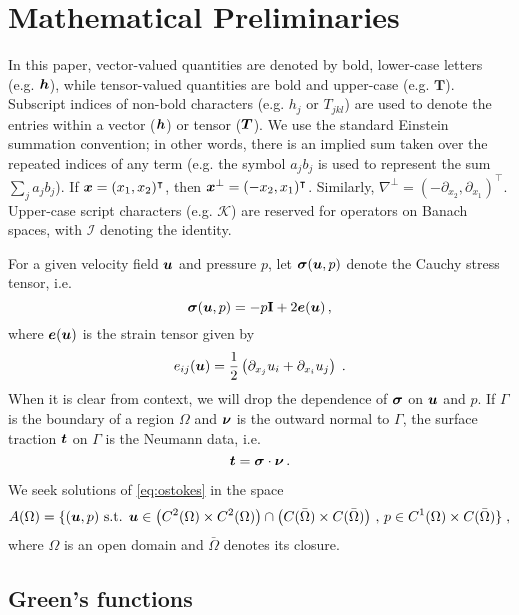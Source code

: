 \section{Mathematical Preliminaries}

In this paper, vector-valued
quantities are denoted by bold, lower-case letters
(e.g. ${\boldsymbol h}$), while tensor-valued quantities are bold
and upper-case (e.g. $\mathbf{T}$). 
Subscript indices of non-bold characters (e.g. $h_j$ or $T_{jkl}$)
are used to denote the entries within a vector (${\boldsymbol h}$) or tensor (${\boldsymbol T}$).
We use the standard Einstein summation convention; in other words, 
there is an implied sum taken over the repeated indices of 
any term (e.g. the symbol $a_{j} b_{j}$ is used to represent the sum
$\sum_{j} a_{j} b_{j}$).
If ${\boldsymbol x} = (x_1,x_2)^\intercal$, then ${\boldsymbol x}^\bot = (-x_2,x_1)^\intercal$.
Similarly, $\nabla^\bot = (-\partial_{x_2},\partial_{x_1})^\intercal$.
Upper-case script characters (e.g. $\mathcal{K}$) are reserved for
operators on Banach spaces, with $\mathcal{I}$ denoting the
identity.

For a given velocity field ${\boldsymbol u}$ and pressure $p$, let ${\boldsymbol \sigma}({\boldsymbol u},p)$
denote the Cauchy stress tensor, i.e.
\begin{equation}
{\boldsymbol \sigma}({\boldsymbol u},p) = -p {\bf I} + 2 {\boldsymbol e}({\boldsymbol u}) \, ,
\end{equation}
where ${\boldsymbol e}({\boldsymbol u})$ is the strain tensor given by
\begin{equation}
e_{ij}({\boldsymbol u}) = \frac{1}{2} \left( \partial_{x_j} u_i + \partial_{x_i} u_j \right) \; .
\end{equation}
When it is clear from context, we will drop the dependence of
${\boldsymbol \sigma}$ on ${\boldsymbol u}$ and $p$.
If $\Gamma$ is the boundary of a region $\Omega$ and ${\boldsymbol \nu}$ is the outward
normal to $\Gamma$, the surface traction ${\boldsymbol t}$ on $\Gamma$ 
is the Neumann data, i.e. 
\begin{equation}
{\boldsymbol t} = {\boldsymbol \sigma} \cdot {\boldsymbol \nu} \, .
\end{equation}

We seek solutions of \cref{eq:ostokes} in the space
\begin{equation}
  A(\Omega) = \{ ({\boldsymbol u},p) \textrm{ s.t. } {\boldsymbol u} \in
  \left ( C^2(\Omega)\times C^2(\Omega) \right ) \cap
  \left ( C(\bar{\Omega}) \times C(\bar{\Omega}) \right ) \, , \,
  p \in C^1(\Omega) \times C(\bar{\Omega})\} \; ,
\end{equation}
where $\Omega$ is an open domain and $\bar{\Omega}$ denotes
its closure.



\subsection{Green's functions}

